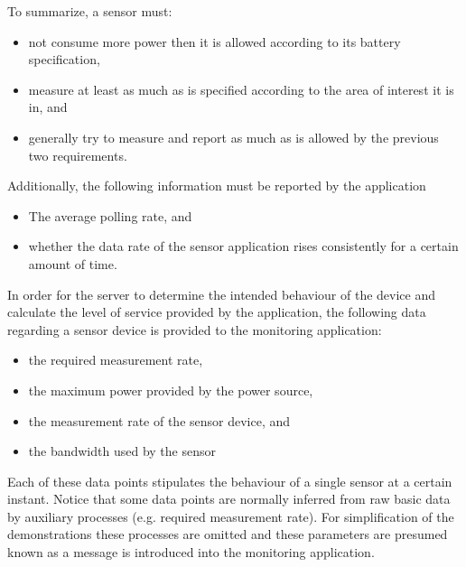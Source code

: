 To summarize, a sensor must:
\begin{itemize}
\nospace
\item not consume more power then it is allowed according to its battery specification,
\item measure at least as much as is specified according to the area of interest it is in, and
\item generally try to measure and report as much as is allowed by the previous two requirements.
\end{itemize}
Additionally, the following information must be reported by the application
\begin{itemize}
\nospace
\item The average polling rate, and
\item whether the data rate of the sensor application rises consistently for a certain amount of time.
\end{itemize}

In order for the server to determine the intended behaviour of the device and calculate the level of service provided by the application, the following data regarding a sensor device is provided to the monitoring application:
\begin{itemize}
\nospace
\item the required measurement rate,
\item the maximum power provided by the power source,
\item the measurement rate of the sensor device, and
\item the bandwidth used by the sensor 
\end{itemize}
Each of these data points stipulates the behaviour of a single sensor at a certain instant. Notice that some data points are normally inferred from raw basic data by auxiliary processes (e.g. required measurement rate). For simplification of the demonstrations these processes are omitted and these parameters are presumed known as a message is introduced into the monitoring application.

